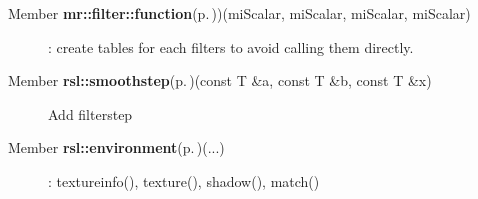 \label{_todo000004}
 \begin{description}
\item[Member {\bf mr::filter::function}{\rm (p.\,\pageref{namespacemr_1_1filter_a0})})(mi\-Scalar, mi\-Scalar, mi\-Scalar, mi\-Scalar) ]: create tables for each filters to avoid calling them directly.\end{description}


\label{_todo000006}
 \begin{description}
\item[Member {\bf rsl::smoothstep}{\rm (p.\,\pageref{namespacersl_a12})}(const T \&a, const T \&b, const T \&x) ]Add filterstep\end{description}


\label{_todo000007}
 \begin{description}
\item[Member {\bf rsl::environment}{\rm (p.\,\pageref{namespacersl_a157})}(...) ]: textureinfo(), texture(), shadow(), match()\end{description}
